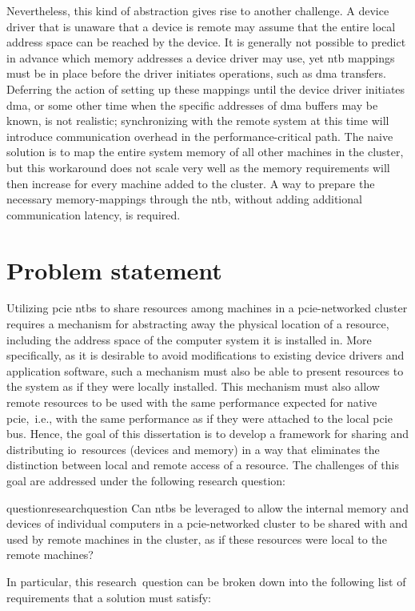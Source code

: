 Nevertheless, this kind of abstraction gives rise to another challenge. 
%
A device driver that is unaware that a device is remote may assume that the entire local address space can be reached by the device.
%
It is generally not possible to predict in advance which memory addresses a device driver may use, yet \gls{ntb} mappings must be in place before the driver initiates operations, such as \gls{dma} transfers.
%
Deferring the action of setting up these mappings until the device driver initiates \gls{dma}, or some other time when the specific addresses of \gls{dma} buffers may be known, is not realistic;
%
synchronizing with the remote system at this time will introduce communication overhead in the performance-critical path.
%
The naive solution is to map the entire system memory of all other machines in the cluster, but this workaround does not scale very well as the memory requirements will then increase for every machine added to the cluster.
%
A way to prepare the necessary memory-mappings through the \gls{ntb}, without adding additional communication latency, is required.




\section{Problem statement}\label{sec:problem}
Utilizing \gls{pcie} \glspl{ntb} to share resources among machines in a \gls{pcie}-networked cluster requires a mechanism for abstracting away the physical location of a resource, including the address space of the computer system it is installed in. 
%
More specifically, as it is desirable to avoid modifications to existing device drivers and application software, such a mechanism must also be able to present resources to the system as if they were locally installed.
%
This mechanism must also allow remote resources to be used with the same performance expected for native \gls{pcie},~i.e., with the same performance as if they were attached to the local \gls{pcie} bus.
%
Hence, the goal of this dissertation is to develop a framework for sharing and distributing \gls{io}~resources (devices and memory) in a way that eliminates the distinction between local and remote access of a resource. 
%
The challenges of this goal are addressed under the following research question: 
\begin{restatable}{question}{researchquestion}\label{question}
    Can \glspl{ntb} be leveraged to allow the internal memory and devices of individual computers in a \gls{pcie}-networked cluster to be shared with and used by remote machines in the cluster, as if these resources were local to the remote machines?
\end{restatable}
%
In particular, this research~question can be broken down into the following list of requirements that a solution must satisfy:


